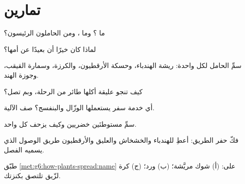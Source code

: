 \section{تمارين}

\begin{exercise}[$\star$]\label{exo:g6:how-plants-spread:1}
ما ؟ وما ، ومن الحاملون الرئيسون؟
\end{exercise}

\begin{exercise}[$\star$]\label{exo:g6:how-plants-spread:2}
لماذا كان خيرًا  أن  بعيدًا عن أمها؟
\end{exercise}

\begin{exercise}[$\star$]\label{exo:g6:how-plants-spread:3}
سمِّ الحامل لكل واحدة: ريشة الهندباء، وحسكة الأرقطيون، والكرزة،
وسمارة القيقب، وجوزة الهند.
\end{exercise}

\begin{exercise}[$\star$]\label{exo:g6:how-plants-spread:4}
كيف تنجو  عليقة أكلها طائر من الرحلة، وبم تصل؟
\end{exercise}

\begin{exercise}[$\star$]\label{exo:g6:how-plants-spread:5}
أي خدمة سفر يستعملها الوزّال والبنفسج؟ صف الآلية.
\end{exercise}

\begin{exercise}[$\star$]\label{exo:g6:how-plants-spread:6}
سمِّ مستوطنَين خضريين وكيف يزحف كل واحد.
\end{exercise}

\begin{exercise}[$\star\star$]\label{exo:g6:how-plants-spread:7}
فكّ حفر الطريق: أعطِ للهندباء والخشخاش والعليق والأرقطيون طريق
الوصول الذي يسميه الفصل.
\end{exercise}

\begin{exercise}[$\star\star$]\label{exo:g6:how-plants-spread:8}
طبّق \cref{met:g6:how-plants-spread:name} على: (أ)  شوك
مريَّشة؛ (ب)  ورد؛ (ج) كرة لزّيق تلتصق بكنزتك.
\end{exercise}

